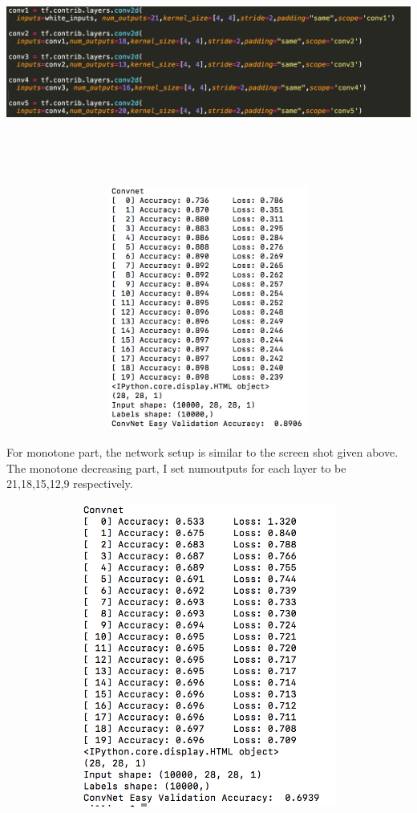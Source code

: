 \documentclass[a4paper,10pt]{article}
\begin{document}
	\par
	\includegraphics[width=135mm,height=80mm]{model1.png}
	\includegraphics[width=135mm,height=80mm]{result1.png}
	\par For monotone part, the network setup is similar to the screen shot given above. The monotone decreasing part, I set numoutputs for each layer to be 21,18,15,12,9 respectively.
	\par
		\includegraphics[width=135mm,height=100mm]{result2.png}
\end{document}
